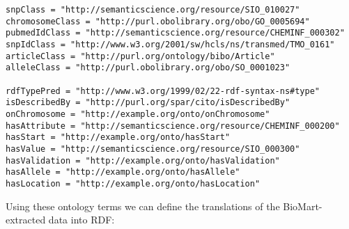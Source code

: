 \documentclass[12pt]{article}
\begin{document}
\begin{footnotesize}
\begin{verbatim}
snpClass = "http://semanticscience.org/resource/SIO_010027"
chromosomeClass = "http://purl.obolibrary.org/obo/GO_0005694"
pubmedIdClass = "http://semanticscience.org/resource/CHEMINF_000302"
snpIdClass = "http://www.w3.org/2001/sw/hcls/ns/transmed/TMO_0161"
articleClass = "http://purl.org/ontology/bibo/Article"
alleleClass = "http://purl.obolibrary.org/obo/SO_0001023"

rdfTypePred = "http://www.w3.org/1999/02/22-rdf-syntax-ns#type"
isDescribedBy = "http://purl.org/spar/cito/isDescribedBy"
onChromosome = "http://example.org/onto/onChromosome"
hasAttribute = "http://semanticscience.org/resource/CHEMINF_000200"
hasStart = "http://example.org/onto/hasStart"
hasValue = "http://semanticscience.org/resource/SIO_000300"
hasValidation = "http://example.org/onto/hasValidation"
hasAllele = "http://example.org/onto/hasAllele"
hasLocation = "http://example.org/onto/hasLocation"
\end{verbatim}
\end{footnotesize}


Using these ontology terms we can define the translations of the BioMart-extracted
data into RDF:
\end{document}
